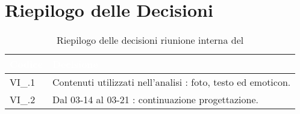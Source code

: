 \section{Riepilogo delle Decisioni}


\begin{table}[!htbp]
    \renewcommand{\arraystretch}{1.5}
    \begin{tabular}{m{}<{\centering}  m{}<{\centering}}
        \rowcolor{darkblue} \textcolor{white}{\textbf{Codice}} & \textcolor{white}{\textbf{Decisione}}                        \\
        \hline
        VI\_{}\D{}.1                                           & Contenuti utilizzati nell'analisi : foto, testo ed emoticon. \\
        VI\_{}\D{}.2                                           & Dal 03-14 al 03-21 : continuazione progettazione.            \\
    \end{tabular}
    \caption{Riepilogo delle decisioni riunione interna del \D}
\end{table}